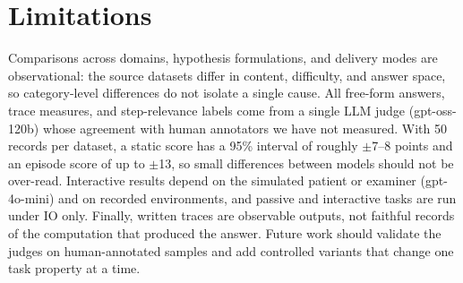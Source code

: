 \FloatBarrier

\section{Limitations}
\label{sec:future_work}
\label{sec:limitations}

Comparisons across domains, hypothesis formulations, and delivery modes are observational: the source datasets differ in content, difficulty, and answer space, so category-level differences do not isolate a single cause. All free-form answers, trace measures, and step-relevance labels come from a single LLM judge (gpt-oss-120b) whose agreement with human annotators we have not measured. With 50 records per dataset, a static score has a 95\% interval of roughly $\pm$7--8 points and an episode score of up to $\pm$13, so small differences between models should not be over-read. Interactive results depend on the simulated patient or examiner (gpt-4o-mini) and on recorded environments, and passive and interactive tasks are run under IO only. Finally, written traces are observable outputs, not faithful records of the computation that produced the answer. Future work should validate the judges on human-annotated samples and add controlled variants that change one task property at a time.

